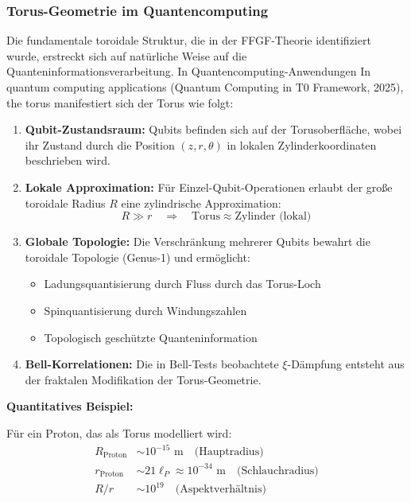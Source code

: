 	\subsubsection{Torus-Geometrie im Quantencomputing}
	
	Die fundamentale toroidale Struktur, die in der FFGF-Theorie identifiziert wurde, erstreckt sich auf natürliche Weise auf die Quanteninformationsverarbeitung. In Quantencomputing-Anwendungen In quantum computing applications (Quantum Computing in T0 Framework, 2025), the torus manifestiert sich der Torus wie folgt:
	
	\begin{enumerate}
		\item \textbf{Qubit-Zustandsraum:} Qubits befinden sich auf der Torusoberfläche, wobei ihr Zustand durch die Position $(z, r, \theta)$ in lokalen Zylinderkoordinaten beschrieben wird.
		
		\item \textbf{Lokale Approximation:} Für Einzel-Qubit-Operationen erlaubt der große toroidale Radius $R$ eine zylindrische Approximation:
		\[
		R \gg r \quad \Rightarrow \quad 
		\text{Torus} \approx \text{Zylinder (lokal)}
		\]
		
		\item \textbf{Globale Topologie:} Die Verschränkung mehrerer Qubits bewahrt die toroidale Topologie (Genus-1) und ermöglicht:
		\begin{itemize}
			\item Ladungsquantisierung durch Fluss durch das Torus-Loch
			\item Spinquantisierung durch Windungszahlen
			\item Topologisch geschützte Quanteninformation
		\end{itemize}
		
		\item \textbf{Bell-Korrelationen:} Die in Bell-Tests beobachtete $\xi$-Dämpfung entsteht aus der fraktalen Modifikation der Torus-Geometrie.
	\end{enumerate}
	
	\textbf{Quantitatives Beispiel:}
	
	Für ein Proton, das als Torus modelliert wird:
	\begin{align}
		R_{\text{Proton}} &\sim 10^{-15} \text{ m} \quad \text{(Hauptradius)} \\
		r_{\text{Proton}} &\sim 21\ell_P \approx 10^{-34} \text{ m} \quad 
		\text{(Schlauchradius)} \\
		R/r &\sim 10^{19} \quad \text{(Aspektverhältnis)}
	\end{align}
	
